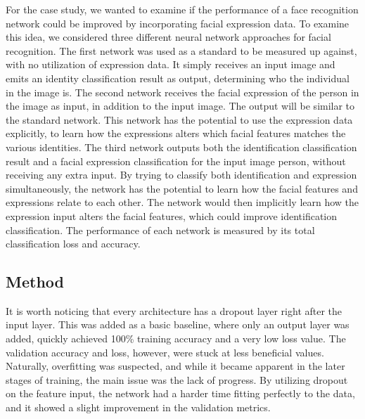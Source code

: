 For the case study, we wanted to examine if the performance of a face recognition network could be improved by incorporating facial expression data. To examine this idea, we considered three different neural network approaches for facial recognition. The first network was used as a standard to be measured up against, with no utilization of expression data. It simply receives an input image and emits an identity classification result as output, determining who the individual in the image is. The second network receives the facial expression of the person in the image as input, in addition to the input image. The output will be similar to the standard network. This network has the potential to use the expression data explicitly, to learn how the expressions alters which facial features matches the various identities. The third network outputs both the identification classification result and a facial expression classification for the input image person, without receiving any extra input. By trying to classify both identification and expression simultaneously, the network has the potential to learn how the facial features and expressions relate to each other. The network would then implicitly learn how the expression input alters the facial features, which could improve identification classification. The performance of each network is measured by its total classification loss and accuracy.

\subsection{Method}




\noindent It is worth noticing that every architecture has a dropout layer right after the input layer. This was added as a basic baseline, where only an output layer was added, quickly achieved 100\% training accuracy and a very low loss value. The validation accuracy and loss, however, were stuck at less beneficial values. Naturally, overfitting was suspected, and while it became apparent in the later stages of training, the main issue was the lack of progress. By utilizing dropout on the feature input, the network had a harder time fitting perfectly to the data, and it showed a slight improvement in the validation metrics. 

